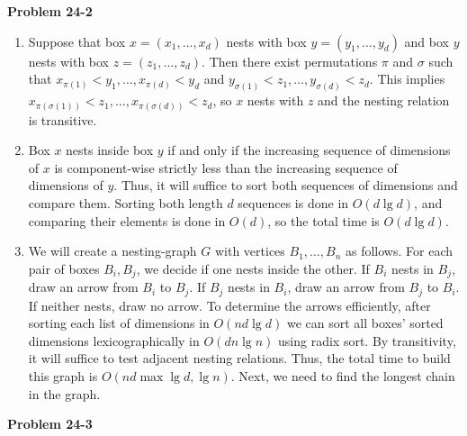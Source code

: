 \documentclass{article}
\begin{document}
\noindent\textbf{Problem 24-2}\\
\begin{enumerate}
\item Suppose that box $x = (x_1, \ldots, x_d)$ nests with box $y = (y_1, \ldots, y_d)$ and box $y$ nests with box $z = (z_1, \ldots, z_d)$.  Then there exist permutations $\pi$ and $\sigma$ such that $x_{\pi(1)} < y_1, \ldots, x_{\pi(d)} < y_d$ and $y_{\sigma(1)} < z_1, \ldots, y_{\sigma(d)} < z_d$.  This implies $x_{\pi(\sigma(1))} < z_1, \ldots, x_{\pi(\sigma(d))} < z_d$, so $x$ nests with $z$ and the nesting relation is transitive. \\

\item Box $x$ nests inside box $y$ if and only if the increasing sequence of dimensions of $x$ is component-wise strictly less than the increasing sequence of dimensions of $y$.  Thus, it will suffice to sort both sequences of dimensions and compare them.  Sorting both length $d$ sequences is done in $O(d \lg d)$, and comparing their elements is done in $O(d)$, so the total time is $O(d \lg d)$. \\

\item We will create a nesting-graph $G$ with vertices $B_1, \ldots, B_n$ as follows.  For each pair of boxes $B_i, B_j$, we decide if one nests inside the other.  If $B_i$ nests in $B_j$, draw an arrow from $B_i$ to $B_j$.  If $B_j$ nests in $B_i$, draw an arrow from $B_j$ to $B_i$.  If neither nests, draw no arrow.  To determine the arrows efficiently, after sorting each list of dimensions in $O(nd\lg d)$ we can sort all boxes' sorted dimensions lexicographically in $O(dn\lg n)$ using radix sort.  By transitivity, it will suffice to test adjacent nesting relations.  Thus, the total time to build this graph is $O(nd \max{\lg d, \lg n})$.  Next, we need to find the longest chain in the graph.  \\
\end{enumerate}

\noindent\textbf{Problem 24-3}\\
\end{document}
